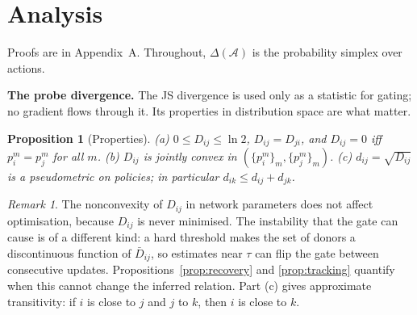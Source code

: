 \documentclass{article}
\newtheorem{proposition}{Proposition}
\theoremstyle{remark}
\newtheorem{remark}{Remark}
\begin{document}
\section{Analysis}
\label{sec:analysis}
Proofs are in Appendix~A. Throughout, $\Delta(\mathcal{A})$ is the probability simplex over actions.

\textbf{The probe divergence.} The JS divergence is used only as a statistic for gating; no gradient flows through it.
Its properties in distribution space are what matter.
\begin{proposition}[Properties]
\label{prop:properties}
(a) $0\le D_{ij}\le\ln 2$, $D_{ij}=D_{ji}$, and $D_{ij}=0$ iff $p_i^m=p_j^m$ for all $m$.
(b) $D_{ij}$ is jointly convex in $(\{p_i^m\}_m,\{p_j^m\}_m)$.
(c) $d_{ij}=\sqrt{D_{ij}}$ is a pseudometric on policies; in particular $d_{ik}\le d_{ij}+d_{jk}$.
\end{proposition}
\begin{remark}
The nonconvexity of $D_{ij}$ in network parameters does not affect optimisation, because $D_{ij}$ is never minimised. The
instability that the gate can cause is of a different kind: a hard threshold makes the set of donors a discontinuous function
of $\bar D_{ij}$, so estimates near $\tau$ can flip the gate between consecutive updates. Propositions~\ref{prop:recovery} and
\ref{prop:tracking} quantify when this cannot change the inferred relation. Part (c) gives approximate transitivity: if $i$ is
close to $j$ and $j$ to $k$, then $i$ is close to $k$.
\end{remark}
\end{document}
